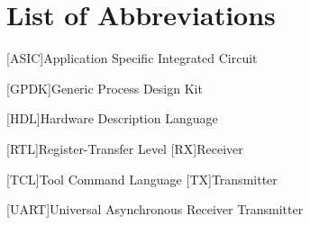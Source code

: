 \section*{List of Abbreviations}
\begin{acronym}
	[ASIC]{Application Specific Integrated Circuit}
		
	[GPDK]{Generic Process Design Kit}
		
	[HDL]{Hardware Description Language}
		
	[RTL]{Register-Transfer Level}
	[RX]{Receiver}
		
	[TCL]{Tool Command Language}
	[TX]{Transmitter}
	
	[UART]{Universal Asynchronous Receiver Transmitter}
	
\end{acronym}


